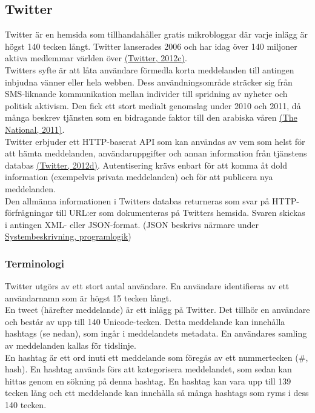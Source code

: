 \documentclass[a4paper,11pt]{article}
\begin{document}
\subsection{Twitter}
Twitter är en hemsida som tillhandahåller gratis mikrobloggar där varje inlägg är högst 140 tecken långt. Twitter lanserades 2006 och har idag över 140 miljoner aktiva medlemmar världen över \hyperref[twitter]{(Twitter, 2012c)}.\\

Twitters syfte är att låta användare förmedla korta meddelanden till antingen inbjudna vänner eller hela webben. Dess användningsområde sträcker sig från SMS-liknande kommunikation mellan individer till spridning av nyheter och politisk aktivism. Den fick ett stort medialt genomslag under 2010 och 2011, då många beskrev tjänsten som en bidragande faktor till den arabiska våren \hyperref[national]{(The National, 2011)}.\\

Twitter erbjuder ett HTTP-baserat API som kan användas av vem som helst för att hämta meddelanden, användaruppgifter och annan information från tjänstens databas \hyperref[twitter]{(Twitter, 2012d)}. Autentisering krävs enbart för att komma åt dold information (exempelvis privata meddelanden) och för att publicera nya meddelanden.\\

Den allmänna informationen i Twitters databas returneras som svar på HTTP-förfrågningar till URL:er som dokumenteras på Twitters hemsida. Svaren skickas i antingen XML- eller JSON-format. (JSON beskrivs närmare under \hyperref[programlogik]{Systembeskrivning, programlogik})

\subsubsection{Terminologi}
Twitter utgörs av ett stort antal användare. En användare identifieras av ett användarnamn som är högst 15 tecken långt. \\

En tweet (härefter meddelande) är ett inlägg på Twitter. Det tillhör en användare och består av upp till 140 Unicode-tecken. Detta meddelande kan innehålla hashtags (se nedan), som ingår i meddelandets metadata. En användares samling av meddelanden kallas för tidslinje. \\

En hashtag är ett ord inuti ett meddelande som föregås av ett nummertecken ({\#}, hash). En hashtag används förs att kategorisera meddelandet, som sedan kan hittas genom en sökning på denna hashtag. En hashtag kan vara upp till 139 tecken lång och ett meddelande kan innehålla så många hashtags som ryms i dess 140 tecken. \\
\end{document}
